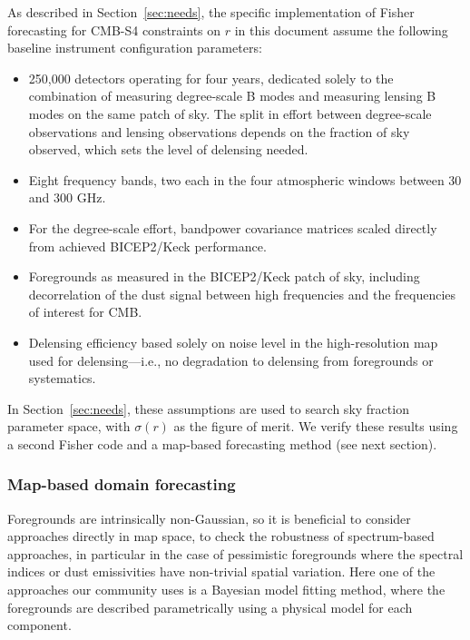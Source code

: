 As described in Section~\ref{sec:needs}, the specific implementation of Fisher forecasting for CMB-S4 constraints
on $r$ in this document assume the following baseline instrument configuration parameters:
%
\begin{itemize}
\item{250,000 detectors operating for four years, dedicated solely to the combination of measuring degree-scale B modes and measuring lensing B modes on the same patch of sky. The split in effort between degree-scale observations and lensing observations depends on the fraction of sky observed, which sets the level of delensing needed.}
\item{Eight frequency bands, two each in the four atmospheric windows between 30 and 300 GHz.}
\item{For the degree-scale effort, bandpower covariance matrices scaled directly from achieved BICEP2/Keck performance.}
\item{Foregrounds as measured in the BICEP2/Keck patch of sky, including decorrelation of the dust signal between high frequencies and the frequencies of interest for CMB.}
\item{Delensing efficiency based solely on noise level in the high-resolution map used for delensing---i.e., no degradation to delensing from foregrounds or systematics.}
\end{itemize}
%
In Section~\ref{sec:needs}, these assumptions are used to search sky fraction parameter space, with 
$\sigma(r)$ as the figure of merit. We verify these results using a second Fisher code and a map-based
forecasting method (see next section).

\subsubsection{Map-based domain forecasting}

Foregrounds are intrinsically non-Gaussian, so it is beneficial to consider approaches directly in map space, to check the robustness of spectrum-based approaches, in particular in the case of pessimistic foregrounds where the spectral indices or dust emissivities have non-trivial spatial variation. Here one of the approaches our community uses is a Bayesian model fitting method, where the foregrounds are described parametrically using a physical model for each component.

